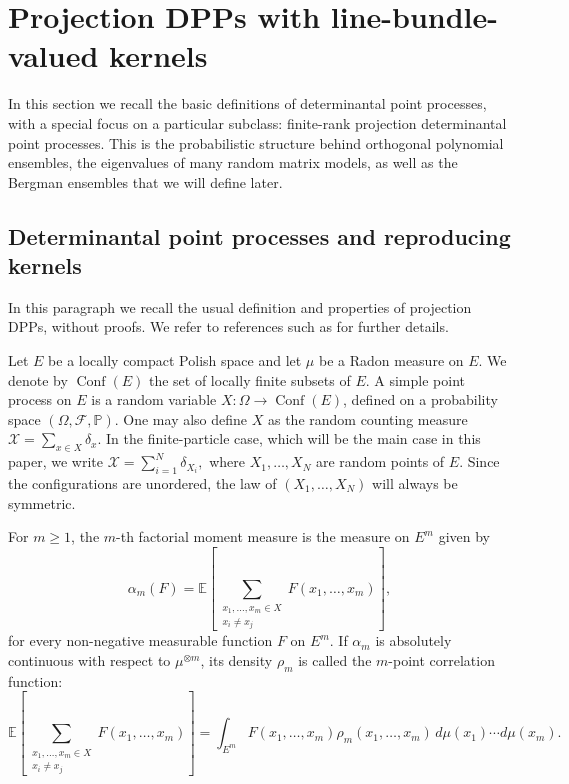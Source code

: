 \documentclass[12pt,a4paper,reqno]{article}
\theoremstyle{thmstyleone}
\theoremstyle{thmstylethree}
\theoremstyle{thmstyletwo}
\numberwithin{equation}{subsection}
\def\geq{\geqslant}
\begin{document}
\section{Projection DPPs with line-bundle-valued kernels}
\label{sec:projection-DPPs}

In this section we recall the basic definitions of determinantal point processes, with a special focus on a particular subclass: finite-rank projection determinantal point processes. This is the probabilistic structure behind orthogonal polynomial ensembles, the eigenvalues of many random matrix models, as well as the Bergman ensembles that we will define later.

\subsection{Determinantal point processes and reproducing kernels}

In this paragraph we recall the usual definition and properties of projection DPPs, without proofs. We refer to references such as \cite{Sos,Lyo,ShiTak,Joh,HKPV} for further details.

Let $E$ be a locally compact Polish space and let $\mu$ be a Radon measure on $E$. We denote by $\operatorname{Conf}(E)$ the set of locally finite subsets of $E$. A simple point process on $E$ is a random variable $X : \Omega \longrightarrow \operatorname{Conf}(E)$, defined on a probability space $(\Omega,\mathcal{F},\mathbb P)$. One may also define $X$ as the random counting measure $\mathcal X=\sum_{x\in X}\delta_x.$ In the finite-particle case, which will be the main case in this paper, we write $\mathcal X=\sum_{i=1}^N \delta_{X_i},$ where $X_1,\ldots,X_N$ are random points of $E$. Since the configurations are unordered, the law of $(X_1,\ldots,X_N)$ will always be symmetric.

For $m\geq 1$, the $m$-th factorial moment measure is the measure on $E^m$ given by
\[
    \alpha_m(F)=\mathbb E\left[\sum_{\substack{x_1,\ldots,x_m\in X\\ x_i\neq x_j}}F(x_1,\ldots,x_m)
    \right],
\]
for every non-negative measurable function $F$ on $E^m$. If $\alpha_m$ is absolutely continuous with respect to $\mu^{\otimes m}$, its density $\rho_m$ is called the $m$-point correlation function:
\[
    \mathbb E\left[\sum_{\substack{x_1,\ldots,x_m\in X\\ x_i\neq x_j}}F(x_1,\ldots,x_m)\right]=\int_{E^m}F(x_1,\ldots,x_m)\rho_m(x_1,\ldots,x_m)\,d\mu(x_1)\cdots d\mu(x_m).
\]
\end{document}
